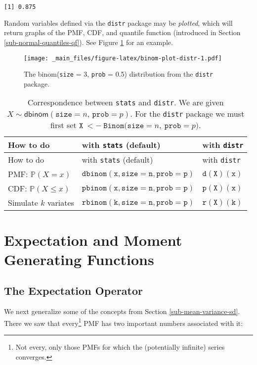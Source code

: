 \documentclass[]{book}
\let\rmarkdownfootnote\footnote%
\def\footnote{\protect\rmarkdownfootnote}
\numberwithin{equation}{chapter}
\numberwithin{figure}{chapter}
\theoremstyle{plain}
\theoremstyle{definition}
\theoremstyle{remark}
\theoremstyle{definition}
\theoremstyle{definition}
\theoremstyle{remark}
\begin{document}
\begin{verbatim}
[1] 0.875
\end{verbatim}

Random variables defined via the \texttt{distr} package \autocite{distr}
may be \emph{plotted}, which will return graphs of the PMF, CDF, and
quantile function (introduced in Section \ref{sub-normal-quantiles-qf}).
See Figure \ref{fig:binom-plot-distr} for an example.

\begin{figure}[htbp]
\centering
\texttt{[image: \_main\_files/figure-latex/binom-plot-distr-1.pdf]}
\caption{\label{fig:binom-plot-distr}\small The \textsf{binom}(\texttt{size} = 3,
\texttt{prob} = 0.5) distribution from the \texttt{distr} package.}
\end{figure}




\begin{longtable}[]{@{}lll@{}}
\caption{Correspondence between \texttt{stats} and \texttt{distr}. We
are given \(X\sim\mathsf{dbinom}(\mathtt{size}=n,\,\mathtt{prob}=p)\).
For the \texttt{distr} package we must first set
\(\mathtt{X\ <-\ Binom(size=}n\mathtt{,\ prob=}p\mathtt{)}\).}\tabularnewline
\toprule
How to do & with \texttt{stats} (default) & with
\texttt{distr}\tabularnewline
\midrule
\endfirsthead
\toprule
How to do & with \texttt{stats} (default) & with
\texttt{distr}\tabularnewline
\midrule
\endhead
PMF: \(\mathbb{P}(X=x)\) & \(\mathtt{dbinom(x,size=n,prob=p)}\) &
\(\mathtt{d(X)(x)}\)\tabularnewline
CDF: \(\mathbb{P}(X\leq x)\) & \(\mathtt{pbinom(x,size=n,prob=p)}\) &
\(\mathtt{p(X)(x)}\)\tabularnewline
Simulate \(k\) variates & \(\mathtt{rbinom(k,size=n,prob=p)}\) &
\(\mathtt{r(X)(k)}\)\tabularnewline
\bottomrule
\end{longtable}

\section{Expectation and Moment Generating
Functions}\label{sec-expectation-and-mgfs}

\subsection{The Expectation Operator}\label{sub-expectation-operator}

We next generalize some of the concepts from Section
\ref{sub-mean-variance-sd}. There we saw that every\footnote{Not every,
  only those PMFs for which the (potentially infinite) series converges.}
PMF has two important numbers associated with it:
\end{document}
